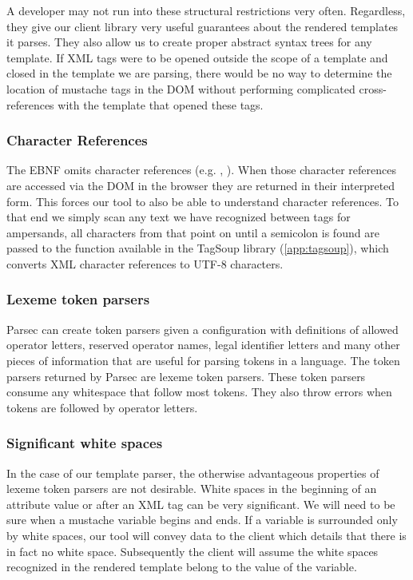 \documentclass[thesis.tex]{subfiles}
\begin{document}
A developer may not run into these structural restrictions very often.
Regardless, they give our client library very useful guarantees about the
rendered templates it parses. They also allow us to create proper abstract
syntax trees for any template.
If XML tags were to be opened outside the scope of a template
and closed in the template we are parsing, there would be no way to determine
the location of mustache tags in the DOM without performing complicated
cross-references with the template that opened these tags.

\subsubsection{Character References}
The EBNF omits character references (e.g. , ).
When those character references are accessed via the DOM in the browser they are
returned in their interpreted form. This forces our tool to also be able to
understand character references. To that end we simply scan any text we have
recognized between tags for ampersands, all characters from that point on until
a semicolon is found are passed to the  function available
in the TagSoup library (\ref{app:tagsoup}), which converts
XML character references to UTF-8 characters.

\subsubsection{Lexeme token parsers}
Parsec can create token parsers given a configuration with definitions of
allowed operator letters, reserved operator names,
legal identifier letters and many other pieces of information
that are useful for parsing tokens in a language.
The token parsers returned by Parsec are lexeme token parsers.
These token parsers consume any whitespace that follow most tokens.
They also throw errors when tokens are followed by operator letters.

\subsubsection{Significant white spaces}
In the case of our template parser, the otherwise advantageous properties
of lexeme token parsers are not desirable.
White spaces in the beginning of an attribute value or after an XML tag can be
very significant.
We will need to be sure when a mustache variable begins and ends.
If a variable is surrounded only by white spaces, our tool will convey
data to the client which details that there is in fact no white space.
Subsequently the client will assume the white spaces recognized in the
rendered template belong to the value of the variable.
\end{document}
